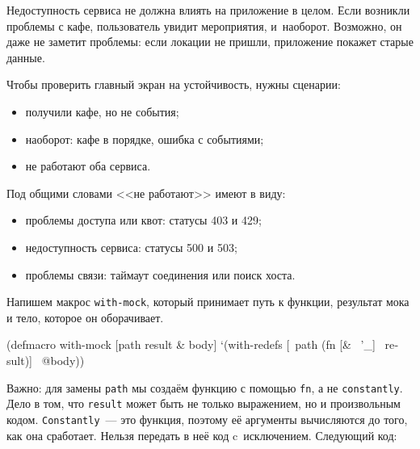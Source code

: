 
Недоступность сервиса не должна влиять на приложение в целом. Если возникли
проблемы с кафе, пользователь увидит мероприятия, и~наоборот. Возможно, он даже
не заметит проблемы: если локации не пришли, приложение покажет старые данные.

Чтобы проверить главный экран на устойчивость, нужны сценарии:

\begin{itemize}

\item
  получили кафе, но не события;

\item
  наоборот: кафе в порядке, ошибка с событиями;

\item
  не работают оба сервиса.

\end{itemize}

Под общими словами <<не работают>> имеют в виду:


\begin{itemize}

\item
  проблемы доступа или квот: статусы 403 и 429;

\item
  недоступность сервиса: статусы 500 и 503;

\item
  проблемы связи: таймаут соединения или поиск хоста.

\end{itemize}

Напишем макрос \verb|with-mock|, который принимает путь к функции, результат
мока и тело, которое он оборачивает.


\begin{english}
  \begin{clojure}
(defmacro with-mock
  [path result & body]
  `(with-redefs
     [~path (fn [& ~'_] ~result)]
     ~@body))
  \end{clojure}
\end{english}

Важно: для замены \verb|path| мы создаём функцию с помощью \verb|fn|, а не
\verb|constantly|. Дело в том, что \verb|result| может быть не только
выражением, но и произвольным кодом. \verb|Constantly|~--- это функция, поэтому её
аргументы вычисляются до того, как она сработает. Нельзя передать в неё код
c~исключением. Следующий код:

